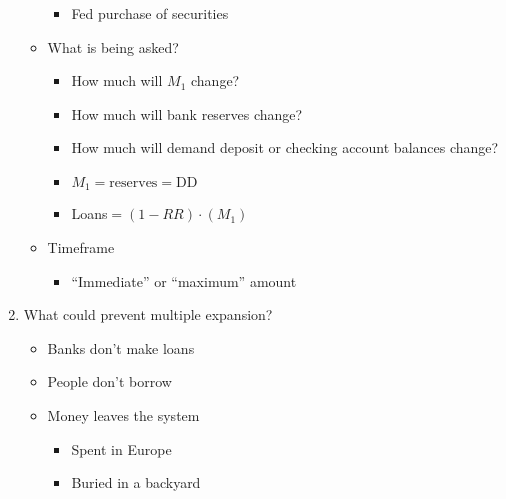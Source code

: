 \documentclass[12pt]{article}
\begin{document}
\begin{enumerate}
\begin{itemize}
\begin{itemize}
          \item Fed purchase of securities
            
        \end{itemize}

      \item What is being asked?

        \begin{itemize}

          \item How much will $M_1$ change?

          \item How much will bank reserves change?

          \item How much will demand deposit or checking account balances change?

          \item $M_1 = \text{reserves} = \text{DD}$

          \item Loans$ = (1-RR)\cdot(M_1)$

        \end{itemize}

      \item Timeframe

        \begin{itemize}

          \item “Immediate” or “maximum” amount

        \end{itemize}
        
    \end{itemize}

  \item What could prevent multiple expansion?

    \begin{itemize}

      \item Banks don't make loans

      \item People don't borrow

      \item Money leaves the system

        \begin{itemize}

          \item Spent in Europe

          \item Buried in a backyard


\end{itemize}
\end{itemize}
\end{enumerate}
\end{document}
